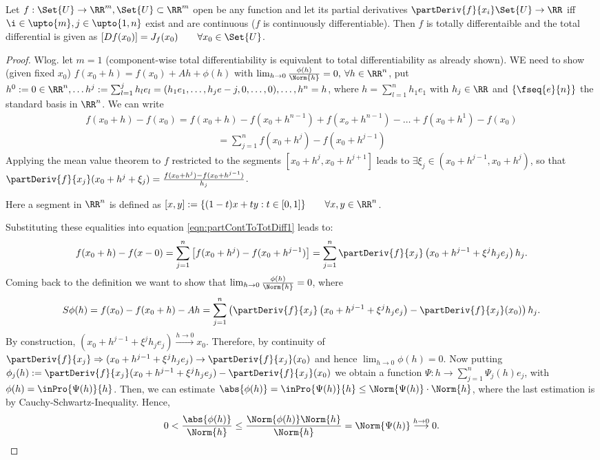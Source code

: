 \begin{thm}
  Let $f:\Set{U}\to\RR^m, \Set{U}\subset\RR^m$ open be any function and let its partial derivatives $\partDeriv{f}{x_i}\Set{U}\to\RR$ iff $\i\in\upto{m}, j\in\upto{1,n}$ exist and are continuous ($f$ is continuously differentiable). Then $f$ is totally differentaible and the total differential is given as $[Df(x_0)]=J_f(x_0)\qquad\forall x_0\in\Set{U}$. 
\end{thm}
\begin{proof}
  Wlog. let $m=1$ (component-wise total differentiability is equivalent to total differentiability as already shown). WE need to show (given fixed $x_0$) $f(x_0+h)=f(x_0)+Ah+\phi(h)$ with $\lim_{h\to 0}\frac{\phi(h)}{\Norm{h}}=0,\:\forall h\in\RR^n$, put $h^0:=0\in\RR^n, \ldots h^j:=\sum_{l=1}^{j}h_le_l=(h_1e_1, \ldots, h_je-j,0,\ldots, 0),\ldots, h^n=h$, where $h=\sum_{l=1}^{n}h_1e_1$ with $h_j\in\RR$ and $\{\fseq{e}{n}\}$ the standard basis in $\RR^n$. We can write \begin{align*}
  	\label{eqn:partContToTotDiff1}
  	f(x_0+h)-f(x_0)=f(x_0+h)-f(x_0+h^{n-1})+f(x_o+h^{n-1})-\ldots+f(x_0+h^1)-f(x_0)
  \end{align*}
  \begin{align}
  	=\sum_{j=1}^{n}f(x_0+h^j)-f(x_0+h^{j-1})
  \end{align}
  Applying the mean value theorem to $f$ restricted to the segments $[x_0+h^j, x_0+h^{j+1}]$ leads to $\exists \xi_j\in(x_0+h^{j-1},x_0+h^j)$, so that $\partDeriv{f}{x_j}(x_0+h^j+\xi_j)=\frac{f(x_0+h^j)-f(x_0+h^{j-1})}{h_j}$. 
  \begin{ldefn}
  	Here a segment in $\RR^n$ is defined as $[x,y]:=\{(1-t)x+ty:t\in[0,1]\}\qquad\forall x, y\in\RR^n$. 
  \end{ldefn}
  Substituting these equalities into equation \ref{eqn:partContToTotDiff1} leads to: \[f(x_0+h)-f(x-0)=\sum_{j=1}^{n}\left[f(x_0+h^j)-f(x_0+h^{j-1})\right]=\sum_{j=1}^{n}\partDeriv{f}{x_j}\left(x_0+h^{j-1}+\xi^jh_je_j\right)h_j.\]
  Coming back to the definition we want to show that $\lim_{h\to 0}\frac{\phi(h)}{\Norm{h}}=0$, where $$S\phi(h)=f(x_0)-f(x_0+h)-Ah=\sum_{j=1}^{n}\left(\partDeriv{f}{x_j}\left(x_0+h^{j-1}+\xi^jh_je_j\right)-\partDeriv{f}{x_j}(x_0)\right)h_j.$$
  By construction, $(x_0+h^{j-1}+\xi^jh_je_j)\overset{h\to 0}{\longrightarrow}x_0$. Therefore, by continuity of $\partDeriv{f}{x_j}\Rightarrow(x_0+h^{j-1}+\xi^jh_je_j)\to\partDeriv{f}{x_j}(x_0)$ and hence $\lim_{h\to 0}\phi(h)=0$. 
  Now putting $\phi_j(h):=\partDeriv{f}{x_j}(x_0+h^{j-1}+\xi^jh_je_j)-\partDeriv{f}{x_j}(x_0)$ we obtain a function $\Psi:h\to\sum_{j=1}^{n}\Psi_j(h)e_j$, with $\phi(h)=\inPro{\Psi(h)}{h}$. Then, we can estimate $\abs{\phi(h)}=\inPro{\Psi(h)}{h}\leq \Norm{\Psi(h)}\cdot\Norm{h}$, where the last estimation is by Cauchy-Schwartz-Inequality. 
  Hence, $$0<\frac{\abs{\phi(h)}}{\Norm{h}}\leq\frac{\Norm{\phi(h)}\Norm{h}}{\Norm{h}}=\Norm{\Psi(h)}\overset{h\to0}{\longrightarrow}0.$$
\end{proof}
